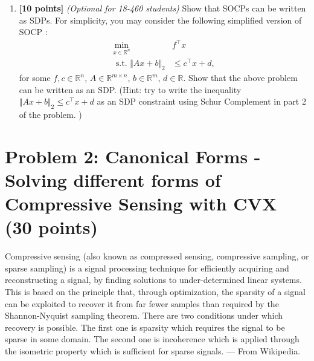 \documentclass{article}
\begin{document}
\begin{enumerate}
\item \textbf{[10 points]}  \emph{(Optional for 18-460 students)}  Show that SOCPs can be written as SDPs. For simplicity, you may consider the following simplified version of SOCP :
\begin{align*}
	\min_{x\in\mathbb{R}^n} & f^\top  x \\
	\text{ s.t. }  \Vert Ax + b\Vert_2 &\leq c^\top x + d,
\end{align*}
for some $f,c\in\mathbb{R}^n$, $A\in \mathbb{R}^{m\times n}$, $b\in \mathbb{R}^m$, $d\in\mathbb{R}$. 
 Show that the above problem can be written as an SDP. (Hint: try to write the inequality $\Vert Ax + b\Vert_2 \leq c^\top x + d$ as an SDP constraint using Schur Complement in part 2 of the problem. )
\begin{tcolorbox}
	\end{tcolorbox}
\end{enumerate}

\newpage
{}
\section*{Problem 2: Canonical Forms - Solving different forms of Compressive Sensing with CVX  (30 points)}

Compressive sensing (also known as compressed sensing, compressive sampling, or sparse sampling) is a signal processing technique for efficiently acquiring and reconstructing a signal, by finding solutions to under-determined linear systems. This is based on the principle that, through optimization, the sparsity of a signal can be exploited to recover it from far fewer samples than required by the Shannon-Nyquist sampling theorem. There are two conditions under which recovery is possible. The first one is sparsity which requires the signal to be sparse in some domain. The second one is incoherence which is applied through the isometric property which is sufficient for sparse signals. --- From Wikipedia. 
\end{document}
